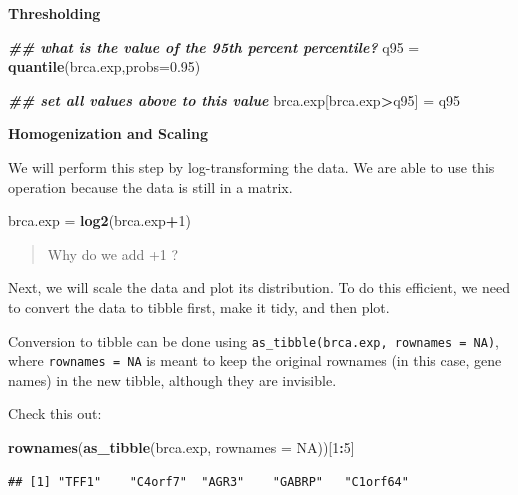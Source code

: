 \documentclass[
]{book}
\newenvironment{Shaded}{\begin{snugshade}}{\end{snugshade}}
\newcommand{\AttributeTok}[1]{\textcolor[rgb]{0.13,0.29,0.53}{#1}}
\newcommand{\ConstantTok}[1]{\textcolor[rgb]{0.56,0.35,0.01}{#1}}
\newcommand{\DecValTok}[1]{\textcolor[rgb]{0.00,0.00,0.81}{#1}}
\newcommand{\DocumentationTok}[1]{\textcolor[rgb]{0.56,0.35,0.01}{\textbf{\textit{#1}}}}
\newcommand{\FloatTok}[1]{\textcolor[rgb]{0.00,0.00,0.81}{#1}}
\newcommand{\FunctionTok}[1]{\textcolor[rgb]{0.13,0.29,0.53}{\textbf{#1}}}
\newcommand{\NormalTok}[1]{#1}
\newcommand{\OtherTok}[1]{\textcolor[rgb]{0.56,0.35,0.01}{#1}}
\newcommand{\SpecialCharTok}[1]{\textcolor[rgb]{0.81,0.36,0.00}{\textbf{#1}}}
\begin{document}
\textbf{Thresholding}

\begin{Shaded}
\begin{Highlighting}[]
\DocumentationTok{\#\# what is the value of the 95th percent percentile?}
\NormalTok{q95 }\OtherTok{=} \FunctionTok{quantile}\NormalTok{(brca.exp,}\AttributeTok{probs=}\FloatTok{0.95}\NormalTok{)}

\DocumentationTok{\#\# set all values above to this value}
\NormalTok{brca.exp[brca.exp}\SpecialCharTok{\textgreater{}}\NormalTok{q95] }\OtherTok{=}\NormalTok{ q95}
\end{Highlighting}
\end{Shaded}

\textbf{Homogenization and Scaling}

We will perform this step by log-transforming the data. We are able to use this operation because the data is still in a matrix.

\begin{Shaded}
\begin{Highlighting}[]
\NormalTok{brca.exp }\OtherTok{=} \FunctionTok{log2}\NormalTok{(brca.exp}\SpecialCharTok{+}\DecValTok{1}\NormalTok{)}
\end{Highlighting}
\end{Shaded}

\begin{quote}
Why do we add +1 ?
\end{quote}

Next, we will scale the data and plot its distribution. To do this efficient, we need to convert the data to tibble first, make it tidy, and then plot.

Conversion to tibble can be done using \texttt{as\_tibble(brca.exp,\ rownames\ =\ NA)}, where \texttt{rownames\ =\ NA} is meant to keep the original rownames (in this case, gene names) in the new tibble, although they are invisible.

Check this out:

\begin{Shaded}
\begin{Highlighting}[]
\FunctionTok{rownames}\NormalTok{(}\FunctionTok{as\_tibble}\NormalTok{(brca.exp, }\AttributeTok{rownames =} \ConstantTok{NA}\NormalTok{))[}\DecValTok{1}\SpecialCharTok{:}\DecValTok{5}\NormalTok{]}
\end{Highlighting}
\end{Shaded}

\begin{verbatim}
## [1] "TFF1"    "C4orf7"  "AGR3"    "GABRP"   "C1orf64"
\end{verbatim}
\end{document}
